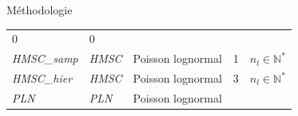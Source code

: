\documentclass[%
]{beamer}
\begin{document}
\begin{frame}{Méthodologie}
\begin{scriptsize}
\begin{longtable}[]{lllll}
\begin{minipage}[t]{0.24\columnwidth}
		0\strut
		\end{minipage} & \begin{minipage}[t]{0.22\columnwidth}\raggedright
		\(0\)\strut
		\end{minipage}\tabularnewline
		\begin{minipage}[t]{0.11\columnwidth}\raggedright
		\emph{HMSC\_samp}\strut
		\end{minipage} & \begin{minipage}[t]{0.09\columnwidth}\raggedright
		\emph{HMSC}\strut
		\end{minipage} & \begin{minipage}[t]{0.19\columnwidth}\raggedright
		Poisson lognormal\strut
		\end{minipage} & \begin{minipage}[t]{0.24\columnwidth}\raggedright
		1\strut
		\end{minipage} & \begin{minipage}[t]{0.22\columnwidth}\raggedright
		\(n_l \in \mathbb{N}^*\)\strut
		\end{minipage}\tabularnewline
		\begin{minipage}[t]{0.11\columnwidth}\raggedright
		\emph{HMSC\_hier}\strut
		\end{minipage} & \begin{minipage}[t]{0.09\columnwidth}\raggedright
		\emph{HMSC}\strut
		\end{minipage} & \begin{minipage}[t]{0.19\columnwidth}\raggedright
		Poisson lognormal\strut
		\end{minipage} & \begin{minipage}[t]{0.24\columnwidth}\raggedright
		3\strut
		\end{minipage} & \begin{minipage}[t]{0.22\columnwidth}\raggedright
		\(n_l \in \mathbb{N}^*\)\strut
		\end{minipage}\tabularnewline\midrule%
		\begin{minipage}[t]{0.11\columnwidth}\raggedright
		\emph{PLN}\strut
		\end{minipage} & \begin{minipage}[t]{0.09\columnwidth}\raggedright
		\emph{PLN}\strut
		\end{minipage} & \begin{minipage}[t]{0.19\columnwidth}\raggedright
		Poisson lognormal\strut
		\end{minipage} & \begin{minipage}[t]{0.24\columnwidth}\raggedright

\end{minipage}
\end{longtable}
\end{scriptsize}
\end{frame}
\end{document}
